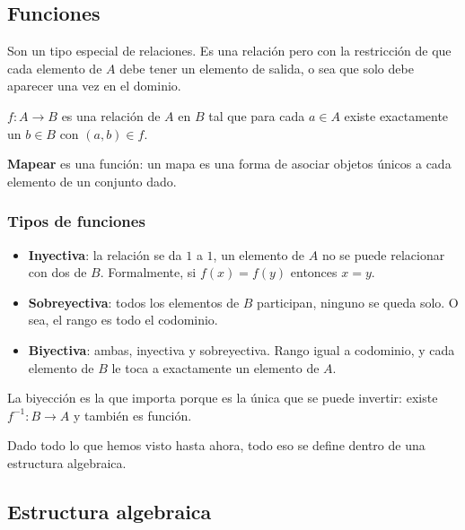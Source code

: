 \documentclass[11pt,letterpaper]{article}
\begin{document}

\subsection*{Funciones}

Son un tipo especial de relaciones. Es una relación pero con la
restricción de que cada elemento de $A$ debe tener un elemento de
salida, o sea que solo debe aparecer una vez en el dominio.

\begin{definicion}[Función]
    $f: A \to B$ es una relación de $A$ en $B$ tal que para cada
    $a \in A$ existe exactamente un $b \in B$ con $(a,b) \in f$.
\end{definicion}

\textbf{Mapear} es una función: un mapa es una forma de asociar
objetos únicos a cada elemento de un conjunto dado.

\subsubsection*{Tipos de funciones}

\begin{itemize}[itemsep=0.2em]
    \item \textbf{Inyectiva}: la relación se da $1$ a $1$, un elemento
          de $A$ no se puede relacionar con dos de $B$. Formalmente,
          si $f(x) = f(y)$ entonces $x = y$.
    \item \textbf{Sobreyectiva}: todos los elementos de $B$ participan,
          ninguno se queda solo. O sea, el rango es todo el codominio.
    \item \textbf{Biyectiva}: ambas, inyectiva y sobreyectiva. Rango
          igual a codominio, y cada elemento de $B$ le toca a exactamente
          un elemento de $A$.
\end{itemize}

La biyección es la que importa porque es la única que se puede
invertir: existe $f^{-1}: B \to A$ y también es función.

Dado todo lo que hemos visto hasta ahora, todo eso se define dentro de
una estructura algebraica.

\newpage


\subsection*{Estructura algebraica}
\end{document}
